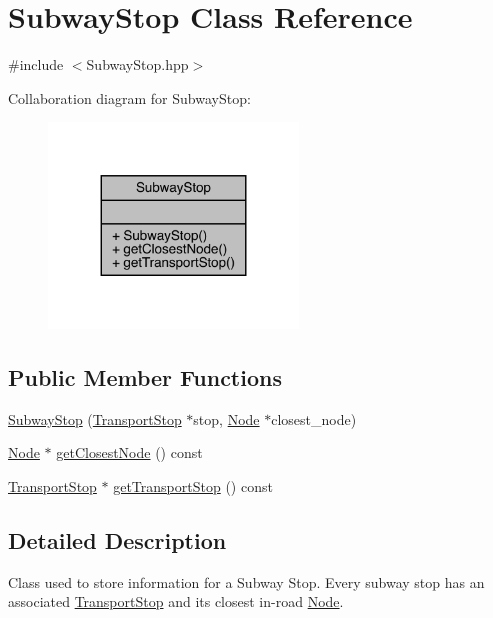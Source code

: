 \hypertarget{class_subway_stop}{}\section{Subway\+Stop Class Reference}
\label{class_subway_stop}


{\ttfamily \#include $<$Subway\+Stop.\+hpp$>$}



Collaboration diagram for Subway\+Stop\+:\nopagebreak
\begin{figure}[H]
\begin{center}
\leavevmode
\includegraphics[width=188pt]{class_subway_stop__coll__graph}
\end{center}
\end{figure}
\subsection*{Public Member Functions}
\begin{DoxyCompactItemize}
\item 
\hyperlink{class_subway_stop_ae29e3908fe6203af1123150c03b026fe}{Subway\+Stop} (\hyperlink{class_transport_stop}{Transport\+Stop} $\ast$stop, \hyperlink{class_node}{Node} $\ast$closest\+\_\+node)
\item 
\hyperlink{class_node}{Node} $\ast$ \hyperlink{class_subway_stop_a575f9f1c940378cb193b2690ad972cf8}{get\+Closest\+Node} () const
\item 
\hyperlink{class_transport_stop}{Transport\+Stop} $\ast$ \hyperlink{class_subway_stop_a5cc277b4da7f0decf74518de16b2966b}{get\+Transport\+Stop} () const
\end{DoxyCompactItemize}


\subsection{Detailed Description}
Class used to store information for a Subway Stop. Every subway stop has an associated \hyperlink{class_transport_stop}{Transport\+Stop} and its closest in-\/road \hyperlink{class_node}{Node}. 

